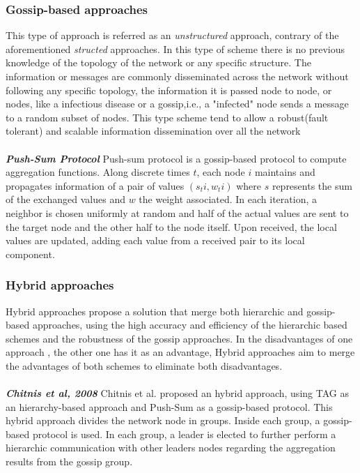 \subsubsection{Gossip-based approaches}
This type of approach is referred as an \textit{unstructured} approach, contrary of the aforementioned \textit{structed} approaches. In this type of scheme there is no previous knowledge of the topology of the network or any specific structure. The information or messages are commonly disseminated across the network without following any specific topology, the information it is passed node to node, or nodes, like a infectious disease or a gossip,i.e., a "infected" node sends a message to a random subset of nodes. This type scheme tend to allow a robust(fault tolerant) and scalable information dissemination over all the network\cite{journals/corr/abs-1110-0725}\\
\\
\textbf{\textit{Push-Sum Protocol}}  Push-sum protocol\cite{kempe2003gossip} is a gossip-based protocol to compute aggregation functions. Along discrete times $t$, each node $i$ maintains and propagates information of a pair of values $(s_ti,w_ti)$ where $s$ represents the sum of the exchanged values and $w$ the weight associated. In each iteration, a neighbor is chosen uniformly at random and half of the actual values are sent to the target node and the other half to the node itself. Upon received, the local values are updated, adding each value from a received pair to its local component\cite{journals/corr/abs-1110-0725}.

\subsubsection{Hybrid approaches} 
Hybrid approaches propose a solution that merge both hierarchic and gossip-based approaches, using the high accuracy and efficiency of the hierarchic based schemes and the robustness of the gossip approaches. In the disadvantages of one approach , the other one has it as an advantage, Hybrid approaches aim to merge the advantages of both schemes to eliminate both disadvantages.\\
\\
\textbf{\textit{Chitnis et al, 2008}} Chitnis et al.\cite{chitnis2008aggregation} proposed an hybrid approach, using TAG as an hierarchy-based approach and Push-Sum as a gossip-based protocol. This hybrid approach divides the network node in groups. Inside each group, a gossip-based protocol is used. In each group, a leader is elected to further perform a hierarchic communication with other  leaders nodes regarding the aggregation results from the gossip group. 


